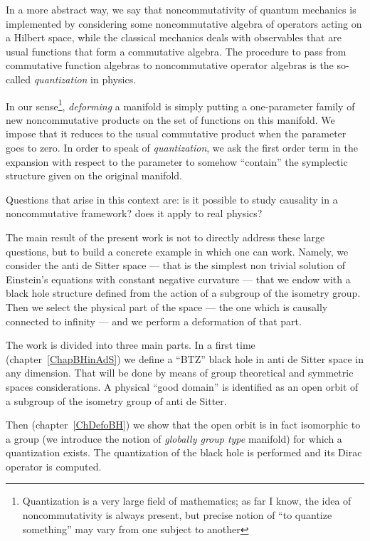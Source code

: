 In a more abstract way, we say that noncommutativity of quantum mechanics is implemented by considering some noncommutative algebra of operators acting on a Hilbert space, while the classical mechanics deals with observables that are usual functions that form a commutative algebra. The procedure to pass from commutative function algebras to noncommutative operator algebras is the so-called \emph{quantization} in physics.

In our sense\footnote{Quantization is a very large field of mathematics; as far I know, the idea of noncommutativity is always present, but precise notion of ``to quantize something'' may vary from one subject to another}, \emph{deforming} a manifold is simply putting a one-parameter family of new noncommutative products on the set of functions on this manifold. We impose that it reduces to the usual commutative product when the parameter goes to zero. In order to speak of \emph{quantization}, we ask the first order term in the expansion with respect to the parameter to somehow ``contain'' the symplectic structure given on the original manifold.

Questions that arise in this context are: is it possible to study causality in a noncommutative framework? does it apply to real physics?

The main result of the present work is not to directly address these large questions, but to build a concrete example in which one can work. Namely, we consider the anti de Sitter space --- that is the simplest non trivial solution of Einstein's equations with constant negative curvature --- that we endow with a black hole structure defined from the action of a subgroup of the isometry group. Then we select the physical part of the space --- the one which is causally connected to infinity --- and we perform a deformation of that part.

The work is divided into three main parts. In a first  time (chapter~\ref{ChapBHinAdS}) we define a ``BTZ'' black hole in anti de Sitter space in any dimension. That will be done by means of group theoretical and symmetric spaces considerations. A physical ``good domain'' is identified as an open orbit of a subgroup of the isometry group of anti de Sitter.

Then (chapter~\ref{ChDefoBH}) we show that the open orbit is in fact isomorphic to a group (we introduce the notion of \emph{globally group type} manifold) for which a quantization exists. The quantization of the black hole is performed and its Dirac operator is computed.

